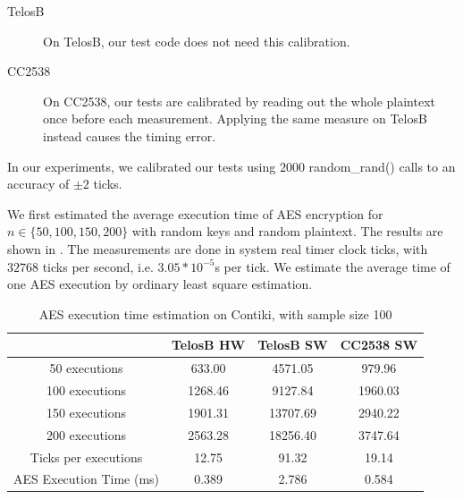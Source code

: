 \begin{description}
	\item[TelosB] On TelosB, our test code does not need this calibration.
	\item[CC2538] On CC2538, our tests are calibrated by reading out the whole plaintext once before each measurement. Applying the same measure on TelosB instead causes the timing error.
\end{description}

In our experiments, we calibrated our tests using $2000$ random\_rand() calls to an accuracy of $\pm{2}$ ticks.

We first estimated the average execution time of AES encryption for $n \in \{ 50, 100, 150, 200\}$ with random keys and random plaintext. The results are shown in . The measurements are done in system real timer clock ticks, with $32768$ ticks per second, i.e. $3.05 * 10^{-5}$s per tick. We estimate the average time of one AES execution by ordinary least square estimation.

\begin{table}[ht!]
	\center
	\begin{tabular}{|c|c|c|c|}
	\hline
	                               & TelosB HW & TelosB SW & CC2538 SW \\ \hline
	50 executions                      & 633.00                  & 4571.05                  & 979.96                  \\ \hline
	100 executions                     & 1268.46                  & 9127.84                 & 1960.03                  \\ \hline
	150 executions                     & 1901.31                  & 13707.69                & 2940.22                  \\ \hline
	200 executions                     & 2563.28                  & 18256.40                & 3747.64                  \\ \hline
        Ticks per executions & 12.75                   & 91.32                   & 19.14                   \\ \hline
	AES Execution Time (ms)   & 0.389                & 2.786               & 0.584                \\ \hline
	\end{tabular}
	\caption{AES execution time estimation on Contiki, with sample size 100}
	\label{Tbl: AES execution time estimation of Contiki}
\end{table}

